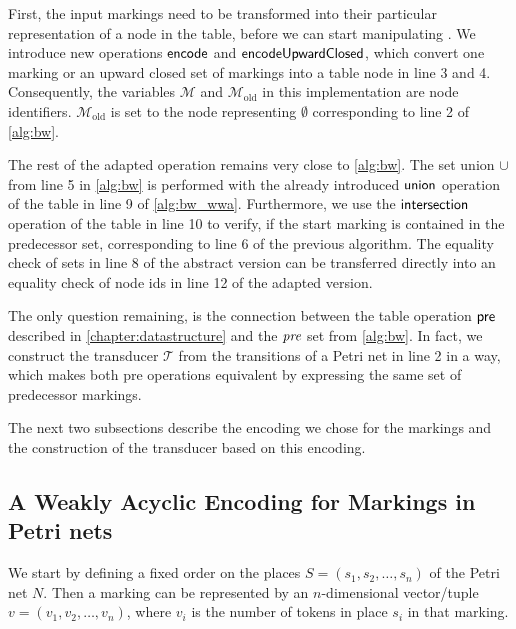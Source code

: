 First, the input markings need to be transformed into their particular representation of a node in the table, before we can start manipulating .
We introduce new operations $\operatorname{\textsf{encode}}$ and $\operatorname{\textsf{encodeUpwardClosed}}$, which convert one marking or an upward closed set of markings into a table node in line 3 and 4. 
Consequently, the variables $\mathcal{M}$ and $\mathcal{M}_{\text{old}} $ in this implementation are node identifiers. $\mathcal{M}_{\text{old}}$ is set to the node representing $\emptyset$ corresponding to line 2 of \autoref{alg:bw}. 
\par
The rest of the adapted operation remains very close to \autoref{alg:bw}. The set union $\cup$ from line 5 in \autoref{alg:bw} is performed with the already introduced $\operatorname{\textsf{union}}$ operation of the table in line 9 of \autoref{alg:bw_wwa}. Furthermore, we use the $\operatorname{\textsf{intersection}}$ operation of the table in line 10 to verify, if the start marking is contained in the predecessor set, corresponding to line 6 of the previous algorithm. The equality check of sets in line 8 of the abstract version can be transferred directly into an equality check of node ids in line 12 of the adapted version.

\par 

The only question remaining, is the connection between the table operation $\operatorname{\textsf{pre}}$ described in \autoref{chapter:datastructure} and the $\operatorname{\textit{pre}}$ set from \autoref{alg:bw}. In fact, we construct the transducer $\mathcal{T}$ from the transitions of a Petri net in line 2 in a way, which makes both pre operations equivalent by expressing the same set of predecessor markings.

\par 

The next two subsections describe the encoding we chose for the markings and the construction of the transducer based on this encoding. 

\subsection{A Weakly Acyclic Encoding for Markings in Petri nets}
We start by defining a fixed order on the places $S = (s_{1},s_{2},\dots,s_{n})$ of the Petri net $N$. Then a marking can be represented by an $n$-dimensional vector/tuple $v = (v_{1},v_{2},\dots,v_{n})$, where $v_{i}$ is the number of tokens in place $s_{i}$ in that marking.

